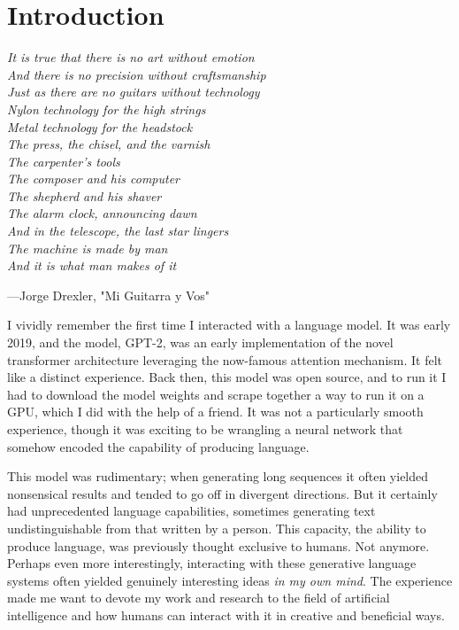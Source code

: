 \chapter{Introduction}


\begin{flushleft}
\begin{minipage}[t]{0.80\textwidth}
\textit{It is true that there is no art without emotion\\
And there is no precision without craftsmanship\\
Just as there are no guitars without technology\\
Nylon technology for the high strings\\
Metal technology for the headstock\\
The press, the chisel, and the varnish\\
The carpenter's tools\\
The composer and his computer\\
The shepherd and his shaver\\
The alarm clock, announcing dawn\\
And in the telescope, the last star lingers\\
The machine is made by man\\
And it is what man makes of it}
\end{minipage}

\medskip
\hfill---Jorge Drexler, "Mi Guitarra y Vos"
\end{flushleft}

\bigskip

I vividly remember the first time I interacted with a language model. It was early 2019, and the model, GPT-2, was an early implementation of the novel transformer architecture leveraging the now-famous attention mechanism. It felt like a distinct experience. Back then, this model was open source, and to run it I had to download the model weights and scrape together a way to run it on a GPU, which I did with the help of a friend. It was not a particularly smooth experience, though it was exciting to be wrangling a neural network that somehow encoded the capability of producing language.

This model was rudimentary; when generating long sequences it often yielded nonsensical results and tended to go off in divergent directions. But it certainly had unprecedented language capabilities, sometimes generating text undistinguishable from that written by a person. This capacity, the ability to produce language, was previously thought exclusive to humans. Not anymore. Perhaps even more interestingly, interacting with these generative language systems often yielded genuinely interesting ideas \textit{in my own mind}.  The experience made me want to devote my work and research to the field of artificial intelligence and how humans can interact with it in creative and beneficial ways.

